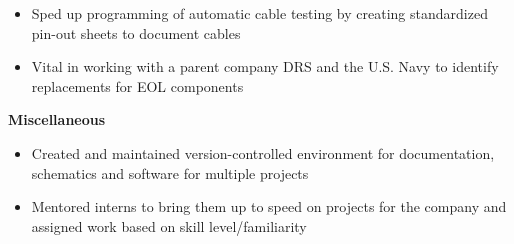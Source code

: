 \begin{cventries}
{\begin{cvitems}
{\begin{itemize}[noitemsep,wide=0pt, leftmargin=\dimexpr{} + 2\relax]
					\item[\textbullet]{Sped up programming of automatic cable testing by creating standardized pin-out sheets to document cables}
					\item[\textbullet]{Vital in working with a parent company DRS and the U.S. Navy to identify replacements for EOL components}
				\end{itemize}}
			\item {\textbf{Miscellaneous}
				\begin{itemize}[noitemsep,wide=0pt, leftmargin=\dimexpr{} + 2\relax]
					\item[\textbullet]{Created and maintained version-controlled environment for documentation, schematics and software for multiple projects}
					\item[\textbullet]{Mentored interns to bring them up to speed on projects for the company and assigned work based on skill level/familiarity}
				\end{itemize}}
		\end{cvitems}
	}
	
\end{cventries}
